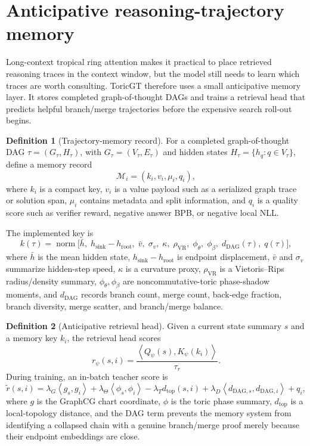 \documentclass[11pt]{article}
\theoremstyle{definition}
\newtheorem{definition}{Definition}[section]
\theoremstyle{plain}
\theoremstyle{remark}
\numberwithin{equation}{section}
\newcommand{\ip}[2]{\left\langle #1,#2\right\rangle}
\begin{document}
\section{Anticipative reasoning-trajectory memory}

Long-context tropical ring attention makes it practical to place retrieved reasoning traces in the context window, but the model still needs to learn which traces are worth consulting.  ToricGT therefore uses a small anticipative memory layer.  It stores completed graph-of-thought DAGs and trains a retrieval head that predicts helpful branch/merge trajectories before the expensive search roll-out begins.

\begin{definition}[Trajectory-memory record]
For a completed graph-of-thought DAG $\tau=(G_\tau,H_\tau)$, with $G_\tau=(V_\tau,E_\tau)$ and hidden states $H_\tau=\{h_q:q\in V_\tau\}$, define a memory record
\begin{equation}
  \mathcal M_i=(k_i,v_i,\mu_i,q_i),
\end{equation}
where $k_i$ is a compact key, $v_i$ is a value payload such as a serialized graph trace or solution span, $\mu_i$ contains metadata and split information, and $q_i$ is a quality score such as verifier reward, negative answer BPB, or negative local NLL.
\end{definition}

The implemented key is
\begin{equation}
  k(\tau)=\operatorname{norm}\big[
  \bar h,\; h_{\mathrm{sink}}-h_{\mathrm{root}},\; \bar v,\;\sigma_v,\;\kappa,\;\rho_{\mathrm{VR}},\;
  \phi_\theta,\;\phi_\beta,\;d_{\mathrm{DAG}}(\tau),\;q(\tau)
  \big],
\end{equation}
where $\bar h$ is the mean hidden state, $h_{\mathrm{sink}}-h_{\mathrm{root}}$ is endpoint displacement, $\bar v$ and $\sigma_v$ summarize hidden-step speed, $\kappa$ is a curvature proxy, $\rho_{\mathrm{VR}}$ is a Vietoris--Rips radius/density summary, $\phi_\theta,\phi_\beta$ are noncommutative-toric phase-shadow moments, and $d_{\mathrm{DAG}}$ records branch count, merge count, back-edge fraction, branch diversity, merge scatter, and branch/merge balance.

\begin{definition}[Anticipative retrieval head]
Given a current state summary $s$ and a memory key $k_i$, the retrieval head scores
\begin{equation}
  r_\psi(s,i)=\frac{\ip{Q_\psi(s)}{K_\psi(k_i)}}{\tau_r}.
\end{equation}
During training, an in-batch teacher score is
\begin{equation}
  \widetilde r(s,i)=
  \lambda_G\ip{g_s}{g_i}
  +\lambda_\Theta\ip{\phi_s}{\phi_i}
  -\lambda_T d_{\mathrm{top}}(s,i)
  +\lambda_D\ip{d_{\mathrm{DAG},s}}{d_{\mathrm{DAG},i}}
  +q_i,
\end{equation}
where $g$ is the GraphCG chart coordinate, $\phi$ is the toric phase summary, $d_{\mathrm{top}}$ is a local-topology distance, and the DAG term prevents the memory system from identifying a collapsed chain with a genuine branch/merge proof merely because their endpoint embeddings are close.
\end{definition}
\end{document}

